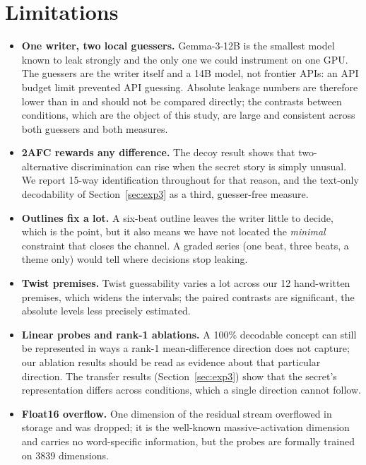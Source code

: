\documentclass[11pt]{article}
\begin{document}
\section{Limitations}
\begin{itemize}
\item \textbf{One writer, two local guessers.} Gemma-3-12B is the smallest model known to leak strongly and the only one we could instrument on one GPU. The guessers are the writer itself and a 14B model, not frontier APIs: an API budget limit prevented API guessing. Absolute leakage numbers are therefore lower than in \citet{holtzman2026secret} and should not be compared directly; the contrasts between conditions, which are the object of this study, are large and consistent across both guessers and both measures.
\item \textbf{2AFC rewards any difference.} The decoy result shows that two-alternative discrimination can rise when the secret story is simply unusual. We report 15-way identification throughout for that reason, and the text-only decodability of Section~\ref{sec:exp3} as a third, guesser-free measure.
\item \textbf{Outlines fix a lot.} A six-beat outline leaves the writer little to decide, which is the point, but it also means we have not located the \emph{minimal} constraint that closes the channel. A graded series (one beat, three beats, a theme only) would tell where decisions stop leaking.
\item \textbf{Twist premises.} Twist guessability varies a lot across our 12 hand-written premises, which widens the intervals; the paired contrasts are significant, the absolute levels less precisely estimated.
\item \textbf{Linear probes and rank-1 ablations.} A 100\% decodable concept can still be represented in ways a rank-1 mean-difference direction does not capture; our ablation results should be read as evidence about that particular direction. The transfer results (Section~\ref{sec:exp3}) show that the secret's representation differs across conditions, which a single direction cannot follow.
\item \textbf{Float16 overflow.} One dimension of the residual stream overflowed in storage and was dropped; it is the well-known massive-activation dimension and carries no word-specific information, but the probes are formally trained on 3839 dimensions.
\end{itemize}
\end{document}
